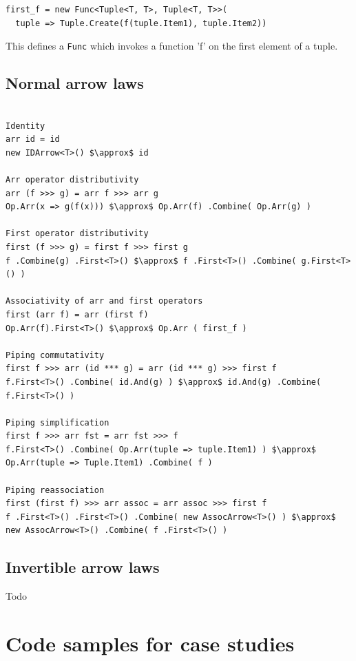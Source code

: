 \documentclass[12pt,twoside,notitlepage]{report}
\begin{document}
\begin{lstlisting}
first_f = new Func<Tuple<T, T>, Tuple<T, T>>(
  tuple => Tuple.Create(f(tuple.Item1), tuple.Item2))
\end{lstlisting}

This defines a \texttt{Func} which invokes a function 'f' on the first element of a tuple.

\section{Normal arrow laws} \label{sec:simle_arrow_laws}

\begin{samepage}
\begin{lstlisting}[mathescape]

Identity
arr id = id
new IDArrow<T>() $\approx$ id

Arr operator distributivity
arr (f >>> g) = arr f >>> arr g
Op.Arr(x => g(f(x))) $\approx$ Op.Arr(f) .Combine( Op.Arr(g) )

First operator distributivity
first (f >>> g) = first f >>> first g
f .Combine(g) .First<T>() $\approx$ f .First<T>() .Combine( g.First<T>() )

Associativity of arr and first operators
first (arr f) = arr (first f)
Op.Arr(f).First<T>() $\approx$ Op.Arr ( first_f )

Piping commutativity
first f >>> arr (id *** g) = arr (id *** g) >>> first f
f.First<T>() .Combine( id.And(g) ) $\approx$ id.And(g) .Combine( f.First<T>() )

Piping simplification
first f >>> arr fst = arr fst >>> f
f.First<T>() .Combine( Op.Arr(tuple => tuple.Item1) ) $\approx$ Op.Arr(tuple => Tuple.Item1) .Combine( f )

Piping reassociation
first (first f) >>> arr assoc = arr assoc >>> first f
f .First<T>() .First<T>() .Combine( new AssocArrow<T>() ) $\approx$ new AssocArrow<T>() .Combine( f .First<T>() )

\end{lstlisting}
\end{samepage}

\section{Invertible arrow laws} \label{sec:invertible_arrow_laws}

Todo

\cleardoublepage


\chapter{Code samples for case studies}
\end{document}
